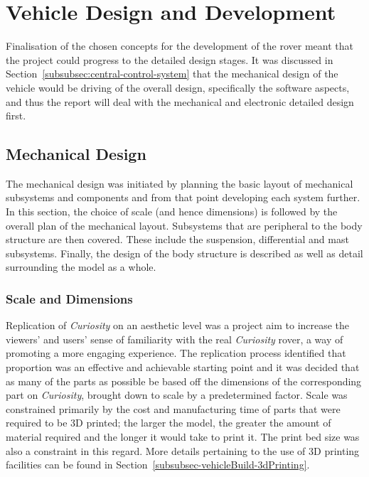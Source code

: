 \section{Vehicle Design and Development}
\label{sec:detailedDesign}
  Finalisation of the chosen concepts for the development of the rover meant that the project could progress to the detailed design stages. It was discussed in Section~\ref{subsubsec:central-control-system} that the mechanical design of the vehicle would be driving of the overall design, specifically the software aspects, and thus the report will deal with the mechanical and electronic detailed design first.
  
  \subsection{Mechanical Design}
    The mechanical design was initiated by planning the basic layout of mechanical subsystems and components and from that point developing each system further. In this section, the choice of scale (and hence dimensions) is followed by the overall plan of the mechanical layout. Subsystems that are peripheral to the body structure are then covered. These include the suspension, differential and mast subsystems. Finally, the design of the body structure is described as well as detail surrounding the model as a whole.
    
    \subsubsection{Scale and Dimensions}
      Replication of \textit{Curiosity} on an aesthetic level was a project aim to increase the viewers' and users' sense of familiarity with the real \textit{Curiosity} rover, a way of promoting a more engaging experience. The replication process identified that proportion was an effective and achievable starting point and it was decided that as many of the parts as possible be based off the dimensions of the corresponding part on \textit{Curiosity}, brought down to scale by a predetermined factor. Scale was constrained primarily by the cost and manufacturing time of parts that were required to be 3D printed; the larger the model, the greater the amount of material required and the longer it would take to print it. The print bed size was also a constraint in this regard. More details pertaining to the use of 3D printing facilities can be found in Section~\ref{subsubsec-vehicleBuild-3dPrinting}.
      
